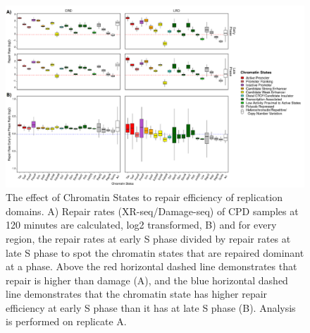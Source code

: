 \begin{figure}[H]
\begin{center}
\includegraphics[width=\textwidth]{Chapters/7_appendix/figures/supfig16}
\caption[The effect of Chromatin States to repair efficiency of replication domains for CPD samples at 120 minutes (replicate A).]{The effect of Chromatin States to repair efficiency of replication domains. A) Repair rates (XR-seq/Damage-seq) of CPD samples at 120 minutes are calculated, log2 transformed, B) and for every region, the repair rates at early S phase divided by repair rates at late S phase to spot the chromatin states that are repaired dominant at a phase. Above the red horizontal dashed line demonstrates that repair is higher than damage (A), and the blue horizontal dashed line demonstrates that the chromatin state has higher repair efficiency at early S phase than it has at late S phase (B). Analysis is performed on replicate A.}
\label{supfig:chromatin4}
\end{center}
\end{figure}

